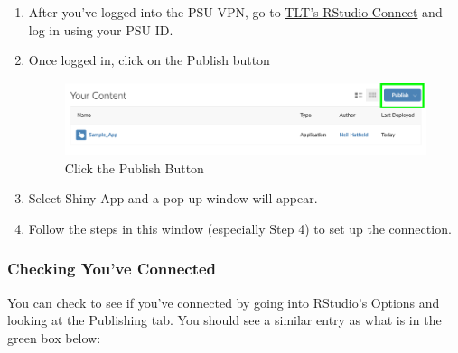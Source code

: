 \documentclass[
]{book}
\providecommand{\tightlist}{%
  \setlength{\itemsep}{0pt}\setlength{\parskip}{0pt}}
\begin{document}
\begin{enumerate}
\def\labelenumi{\arabic{enumi}.}
\tightlist
\item
  After you've logged into the PSU VPN, go to \href{https://rstudio-connect.tlt.psu.edu:3939/connect}{TLT's RStudio Connect} and log in using your PSU ID.
\item
  Once logged in, click on the Publish button

  \begin{figure}
  \includegraphics[width=12.26in]{images/publish1} \caption{Click the Publish Button}\label{fig:testing1}
  \end{figure}
\item
  Select Shiny App and a pop up window will appear.
\item
  Follow the steps in this window (especially Step 4) to set up the connection.
\end{enumerate}

\hypertarget{checking-youve-connected}{%
\subsubsection{Checking You've Connected}\label{checking-youve-connected}}

You can check to see if you've connected by going into RStudio's Options and looking at the Publishing tab. You should see a similar entry as what is in the green box below:
\end{document}
